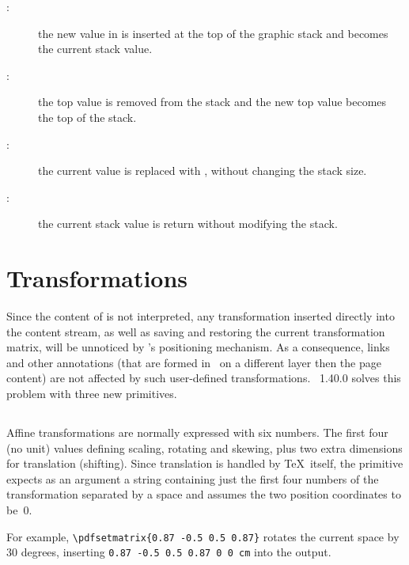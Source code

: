 \documentclass{pdftexmanual}
\begin{document}
\begin{description}
\item[:] the new value in  is inserted at
the top of the graphic stack and becomes the current stack value.

\item[:] the top value is removed from the stack and the new
top value becomes the top of the stack.

\item[:] the current value is replaced with
, without changing the stack size.

\item[:] the current stack value is return without
modifying the stack.
\end{description}


\section{Transformations}

Since the content of  is not interpreted, any
transformation inserted directly into the content stream, as well as
saving and restoring the current transformation matrix, will be
unnoticed by \PDFTEX's positioning mechanism. As a consequence, links
and other annotations (that are formed in \PDF\ on a different layer
then the page content) are not affected by such user-defined
transformations. \PDFTEX\ 1.40.0 solves this problem with three new
primitives.

\subsection{}

Affine transformations are normally expressed with six numbers. The
first four (no unit) values defining scaling, rotating and skewing, plus
two extra dimensions for translation (shifting). Since translation is
handled by \TeX\ itself, the  primitive expects as an
argument a string containing just the first four numbers of the
transformation separated by a space and assumes the two position
coordinates to be~0.

For example, \verb|\pdfsetmatrix{0.87 -0.5 0.5 0.87}| rotates the
current space by 30 degrees, inserting
\verb|0.87 -0.5 0.5 0.87 0 0 cm| into the output. 
\end{document}
